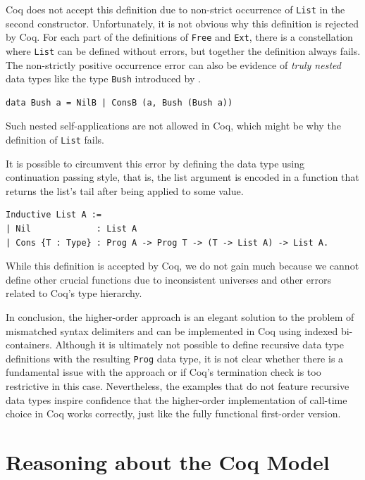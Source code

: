 \documentclass[a4paper, 11pt, fleqn, twoside, abstract=on]{scrreprt}
\newcommand{\hinl}[1]{\texttt{#1}}
\newcommand{\cinl}[1]{\texttt{#1}}
\begin{document}
Coq does not accept this definition due to non-strict occurrence of \cinl{List} in the second constructor.
Unfortunately, it is not obvious why this definition is rejected by Coq.
For each part of the definitions of \cinl{Free} and \cinl{Ext}, there is a constellation where \cinl{List} can be defined without errors, but together the definition always fails.
The non-strictly positive occurrence error can also be evidence of \textit{truly nested} data types like the type \hinl{Bush} introduced by \citet{bird1998nested}.

\begin{verbatim}
data Bush a = NilB | ConsB (a, Bush (Bush a))
\end{verbatim}

Such nested self-applications are not allowed in Coq, which might be why the definition of \cinl{List} fails.

It is possible to circumvent this error by defining the data type using continuation passing style, that is, the list argument is encoded in a function that returns the list's tail after being applied to some value.

\begin{verbatim}
Inductive List A :=
| Nil             : List A
| Cons {T : Type} : Prog A -> Prog T -> (T -> List A) -> List A.
\end{verbatim}

While this definition is accepted by Coq, we do not gain much because we cannot define other crucial functions due to inconsistent universes and other errors related to Coq's type hierarchy.

In conclusion, the higher-order approach is an elegant solution to the problem of mismatched syntax delimiters and can be implemented in Coq using indexed bi-containers.
Although it is ultimately not possible to define recursive data type definitions with the resulting \cinl{Prog} data type, it is not clear whether there is a fundamental issue with the approach or if Coq's termination check is too restrictive in this case.
Nevertheless, the examples that do not feature recursive data types inspire confidence that the higher-order implementation of call-time choice in Coq works correctly, just like the fully functional first-order version.

\chapter{Reasoning about the Coq Model}
\label{ch:progsInCoq}
\end{document}
